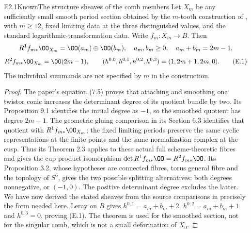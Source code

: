 \begin{claim}{E2.1}{Known}{The structure sheaves of the comb members}
Let $X_m$ be any sufficiently small smooth period section obtained by
the $m$-tooth construction of
\citet[Theorem 1.1]{ViaclovskyCombs2026}, with
$m\ge12$, fixed limiting data at the three distinguished values, and
the standard logarithmic-transformation data. Write
$f_m:X_m\to B$. Then
\[
 R^1f_{m*}\OO_{X_m}=\OO(a_m)\oplus\OO(b_m),\quad
 a_m,b_m\ge0,\quad a_m+b_m=2m-1,
\]
\[
 R^2f_{m*}\OO_{X_m}=\OO(2m-1),\qquad
 (h^{0,0},h^{0,1},h^{0,2},h^{0,3})=(1,2m+1,2m,0).      \tag{E.1}
\]
The individual summands are not specified by $m$ in the construction.
\end{claim}
\begin{proof}
The paper's equation (7.5) proves that attaching and smoothing one
twistor conic increases the determinant degree of its quotient bundle
by two. Its Proposition 9.1 identifies the initial degree as $-1$,
so the smoothed quotient has degree $2m-1$. The geometric gluing
comparison in its Section 6.3 identifies that quotient with
$R^1f_{m*}\OO_{X_m}$; the fixed limiting periods preserve the same
cyclic representations at the finite points and the same
normalization complex at the cusp. Thus its Theorem 2.3 applies to
these actual full scheme-theoretic fibres and gives the cup-product
isomorphism $\det R^1f_{m*}\OO=R^2f_{m*}\OO$.
Its Proposition 3.2, whose hypotheses are connected fibres, torus
general fibre and the topology of $S^6$, gives the two possible
splitting alternatives: both degrees nonnegative, or $(-1,0)$.
The positive determinant degree excludes the latter. We have now
derived the stated sheaves from the source comparisons in precisely
the form needed here. Leray on $B$ gives $h^{0,1}=a_m+b_m+2$,
$h^{0,2}=a_m+b_m+1$ and $h^{0,3}=0$, proving (E.1).
The theorem is used for the smoothed section, not for the singular
comb, which is not a small deformation of $X_0$.
\end{proof}

